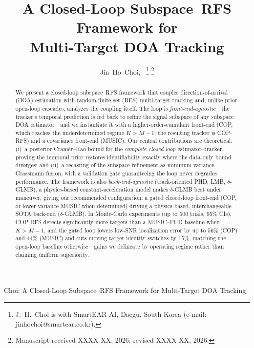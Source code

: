 \documentclass[journal]{IEEEtran}
\begin{document}
\title{A Closed-Loop Subspace--RFS Framework for\\Multi-Target DOA Tracking}

\author{Jin~Ho~Choi,~
\thanks{J.~H.~Choi is with SmartEAR AI, Daegu, South Korea (e-mail: jinhochoi@smartear.co.kr).}
\thanks{Manuscript received XXXX XX, 2026; revised XXXX XX, 2026.}}

{Choi: A Closed-Loop Subspace--RFS Framework for Multi-Target DOA Tracking}

\maketitle

\begin{abstract}
We present a closed-loop subspace--RFS framework that couples direction-of-arrival (DOA) estimation with random-finite-set (RFS) multi-target tracking and, unlike prior open-loop cascades, analyzes the coupling itself. The loop is \emph{front-end-agnostic}---the tracker's temporal prediction is fed back to refine the signal subspace of any subspace DOA estimator---and we instantiate it with a higher-order-cumulant front-end (COP, which reaches the underdetermined regime $K>M{-}1$; the resulting tracker is COP-RFS) and a covariance front-end (MUSIC). Our central contributions are theoretical: (i)~a posterior Cram\'{e}r--Rao bound for the \emph{complete closed-loop} estimator--tracker, proving the temporal prior restores identifiability exactly where the data-only bound diverges; and (ii)~a recasting of the subspace refinement as minimum-variance Grassmann fusion, with a validation gate guaranteeing the loop never degrades performance. The framework is also \emph{back-end-agnostic} (track-oriented PHD, LMB, $\delta$-GLMB); a physics-based constant-acceleration model makes $\delta$-GLMB best under maneuver, giving our recommended configuration: a gated closed-loop front-end (COP, or lower-variance MUSIC when determined) driving a physics-based, interchangeable SOTA back-end ($\delta$-GLMB). In Monte-Carlo experiments (up to $500$ trials, $95\%$ CIs), COP-RFS detects significantly more targets than a MUSIC--PHD baseline when $K>M{-}1$, and the gated loop lowers low-SNR localization error by up to $56\%$ (COP) and $44\%$ (MUSIC) and cuts moving-target identity switches by $15\%$, matching the open-loop baseline otherwise---gains we delineate by operating regime rather than claiming uniform superiority.
\end{abstract}
\end{document}

